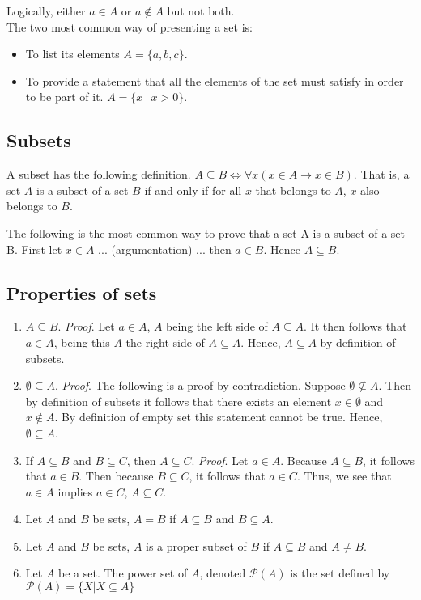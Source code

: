 \documentclass[11pt]{article}
\begin{document}
    Logically, either $a \in A$ or $a \notin A$ but not both.\\

    The two most common way of presenting a set is:\\
    \begin{itemize}
        \item To list its elements $A = \{a, b, c\}$.
        \item To provide a statement that all the elements of the set must satisfy in order to be part of it. $ A = \{x\ |\ x > 0\} $.
    \end{itemize}
    \subsection{Subsets}
        A subset has the following definition. $ A \subseteq B \Leftrightarrow \forall x(x \in A \rightarrow x \in B) $. That is, a set $A$ is a subset of a set $B$ if and only if for all $x$ that belongs to $A$, $x$ also belongs to $B$.

        The following is the most common way to prove that a set A is a subset of a set B. First let $x \in A$ ... (argumentation) ... then $a \in B$. Hence $A \subseteq B$.

    \subsection{Properties of sets}
        \begin{enumerate}
            \item $A \subseteq B$. \textit{Proof}. Let $a \in A$, $A$ being the left side of $A \subseteq A$. It then follows that $a \in A$, being this $A$ the right side of $A \subseteq A$. Hence, $A \subseteq A$ by definition of subsets.
            \item $\emptyset \subseteq A$. \textit{Proof}. The following is a proof by contradiction. Suppose $\emptyset \not \subseteq A$. Then by definition of subsets it follows that there exists an element $x \in \emptyset$ and $x \not \in A$. By definition of empty set this statement cannot be true. Hence, $\emptyset \subseteq A$.
            \item If $A \subseteq B$ and $B \subseteq C$, then $A \subseteq C$. \textit{Proof}. Let $a \in A$. Because $A \subseteq B$, it follows that $a \in B$. Then because $B \subseteq C$, it follows that $a \in C$. Thus, we see that $a \in A$ implies $a \in C$, $A \subseteq C$.
            \item Let $A$ and $B$ be sets, $A = B$ if $A \subseteq B$ and $B \subseteq A$.
            \item Let $A$ and $B$ be sets, $A$ is a proper subset of $B$ if $A \subseteq B$ and $A \not = B$.
            \item Let $A$ be a set. The power set of $A$, denoted $\mathcal{P}(A)$ is the set defined by $\mathcal{P}(A) = \{X | X \subseteq A \}$
        \end{enumerate}
\end{document}
